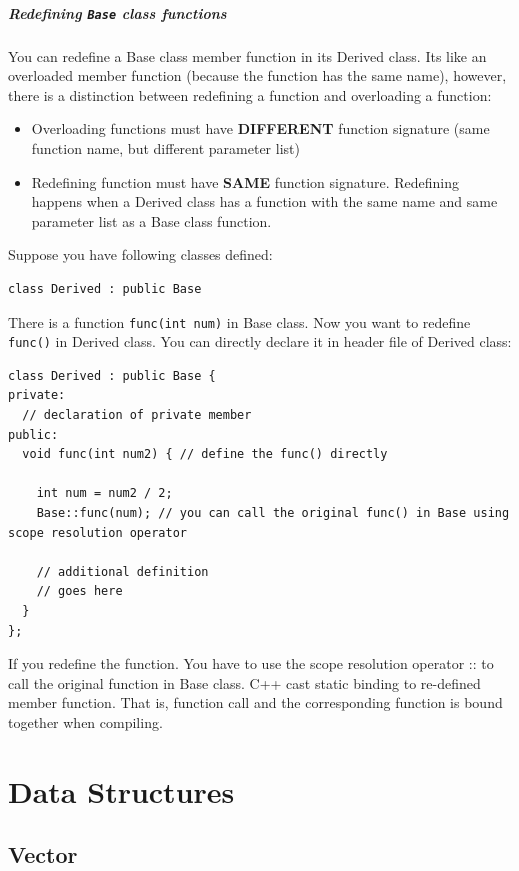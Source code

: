 \documentclass[12pt]{book}
\begin{document}
\subsubsection{Redefining \texttt{Base} class functions}
\label{sec:org66c8bfe}
You can redefine a Base class member function in its Derived  class. Its like an overloaded member function (because the function has the same name), however, there is a distinction between redefining a function and overloading a function:
\begin{itemize}
\item Overloading functions must have \textbf{DIFFERENT} function signature (same function name, but different parameter list)
\item Redefining function must have \textbf{SAME} function signature. Redefining happens when a Derived class has a function with the same name and same parameter list as a Base class function.
\end{itemize}

Suppose you have following classes defined:
\begin{verbatim}
class Derived : public Base
\end{verbatim}

There is a function \texttt{func(int num)} in Base class. Now you want to redefine \texttt{func()} in Derived class. You can directly declare it in header file of Derived class:
\begin{verbatim}
class Derived : public Base {
private:
  // declaration of private member
public:
  void func(int num2) { // define the func() directly

    int num = num2 / 2;
    Base::func(num); // you can call the original func() in Base using scope resolution operator 

    // additional definition
    // goes here
  }
};
\end{verbatim}

If you redefine the function. You have to use the scope resolution operator :: to call the original function in Base class. C++ cast static binding to re-defined member function. That is, function call and the corresponding function is bound together when compiling.

\part{Data Structures}
\label{sec:org6fe9dac}
\chapter{Vector}
\label{sec:org671922f}
\end{document}
